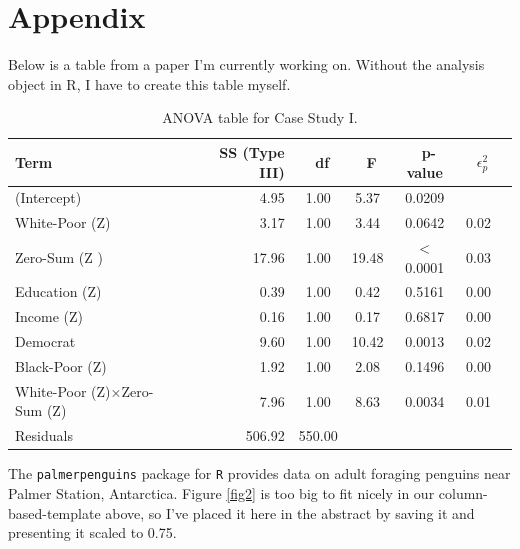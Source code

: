 \documentclass{article}\usepackage[]{graphicx}\usepackage[]{xcolor}
\begin{document}
\begin{multicols}{2}
\nocite{xtable}
\nocite{palmerpenguins}
\nocite{9abfb448-e032-3b5b-972c-40954bc7e23c}


\begin{tiny}

\end{tiny}
\end{multicols}

\newpage
\onecolumn
\section{Appendix}

Below is a table from a paper I’m currently working on. Without the analysis object in R, I have to create this table myself.
\begin{table}[H]
\begin{center}
\begin{tabular}{lrccccc}\hline
Term & \ SS (Type III) & \ df &\ F &\ p-value &\ $\epsilon_p^2$ \\\hline
(Intercept) &4.95 &1.00 &5.37 &0.0209\\
White-Poor (Z) &3.17 &1.00 &3.44 &0.0642 & 0.02\\
Zero-Sum (Z ) &17.96 &1.00 &19.48 &\hspace{-0.78em}$<$0.0001 &0.03\\
Education (Z) &0.39 &1.00 &0.42 &0.5161 &0.00\\
Income (Z) &0.16 &1.00 &0.17 &0.6817 &0.00\\
Democrat &9.60 &1.00 &10.42 &0.0013 &0.02\\
Black-Poor (Z) &1.92 &1.00 &2.08 &0.1496 &0.00\\
White-Poor (Z)×Zero-Sum (Z) &7.96 &1.00 &8.63 &0.0034 &0.01\\
Residuals &506.92 &550.00\\\hline
\end{tabular} 
\caption{ANOVA table for Case Study I.}
\label{anova.tab}
\end{center}
\end{table}
The \texttt{palmerpenguins} package for \texttt{R} \citep{palmerpenguins} provides data on adult foraging penguins near Palmer Station, Antarctica. Figure \ref{fig2} is too big to fit nicely in our column-based-template above, so I’ve placed it here in the abstract by saving it and presenting it scaled to 0.75.
\end{document}
